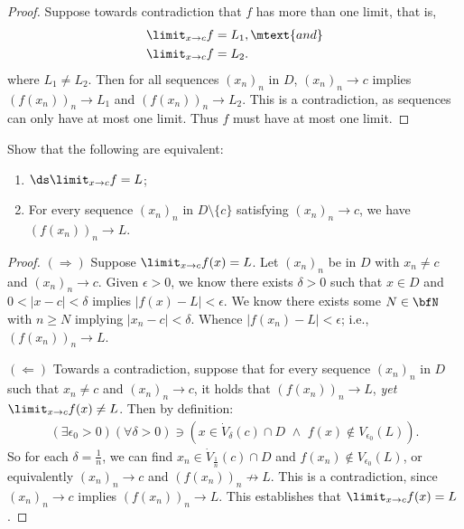 \documentclass[11pt,twoside,openany]{memoir}
\begin{document}
        \begin{proof}
            Suppose towards contradiction that $f$ has more than one limit, that is,
                \begin{equation*}
                \begin{split}
                    \limit_{x \rightarrow c}f &= L_1, \mtext{and} \\
                    \limit_{x \rightarrow c}f &= L_2.
                \end{split}
                \end{equation*}
            where $L_1 \neq L_2$. Then for all sequences $(x_n)_n$ in $D$, $(x_n)_n \rightarrow c$ implies $(f(x_n))_n \rightarrow L_1$ and $(f(x_n))_n \rightarrow L_2$. This is a contradiction, as sequences can only have at most one limit. Thus $f$ must have at most one limit.
        \end{proof}
    \begin{exercise}
        Show that the following are equivalent:
            \begin{enumerate}[label = (\roman*)]
                \item $\ds \limit_{x \rightarrow c}f = L$;
                \item For every sequence $(x_n)_n$ in $D \setminus \{c\}$ satisfying $(x_n)_n \rightarrow c$, we have $(f(x_n))_n \rightarrow L$.
            \end{enumerate}
    \end{exercise}
        \begin{proof}
            $(\Rightarrow)$ Suppose $\limit_{x \rightarrow c}f(x) = L$. Let $(x_n)_n$ be in $D$ with $x_n \neq c$ and $(x_n)_n \rightarrow c$. Given $\epsilon > 0$, we know there exists $\delta > 0$ such that $x \in D$ and $0 < |x-c| < \delta$ implies $|f(x)-L| < \epsilon$. We know there exists some $N \in \bfN$ with $n\geq N$ implying $|x_n - c| < \delta$. Whence $|f(x_n) - L| < \epsilon$; i.e., $(f(x_n))_n \rightarrow L$. \nl

            $(\Leftarrow)$ Towards a contradiction, suppose that for every sequence $(x_n)_n$ in $D$ such that $x_n \neq c$ and $(x_n)_n \rightarrow c$, it holds that $(f(x_n))_n \rightarrow L$, \textit{yet} $\limit_{x \rightarrow c}f(x) \neq L$. Then by definition:
                \begin{equation*}
                \begin{split}
                    (\exists \epsilon_0 > 0)(\forall \delta >0) \ni (x \in \dot{V}_\delta(c)\cap D \hspace{4pt}\land\hspace{4pt} f(x) \not\in V_{\epsilon_0}(L)).
                \end{split}
                \end{equation*}
            So for each $\delta = \frac{1}{n}$, we can find $x_n \in \dot{V}_{\frac{1}{n}}(c) \cap D$ and $f(x_n) \not\in V_{\epsilon_0}(L)$, or equivalently $(x_n)_n \rightarrow c$ and $(f(x_n))_n \not\rightarrow L$. This is a contradiction, since $(x_n)_n \rightarrow c$ implies $(f(x_n))_n \rightarrow L$. This establishes that $\limit_{x \rightarrow c}f(x) = L$.
        \end{proof}
\end{document}
